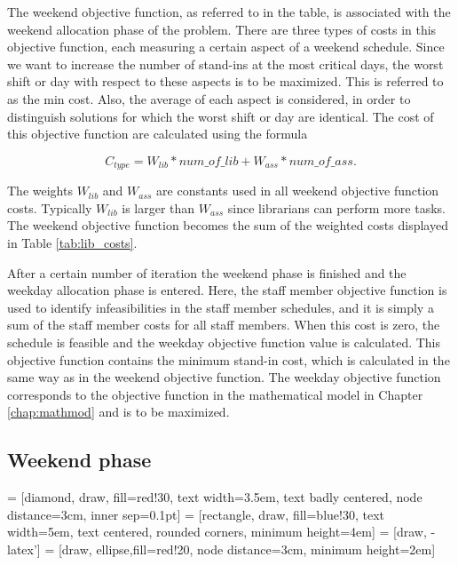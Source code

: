 The weekend objective function, as referred to in the table, is associated with the weekend allocation phase of the problem. There are three types of costs in this objective function, each measuring a certain aspect of a weekend schedule. Since we want to increase the number of stand-ins at the most critical days, the worst shift or day with respect to these aspects is to be maximized. This is referred to as the min cost. Also, the average of each aspect is considered, in order to distinguish solutions for which the worst shift or day are identical. The cost of this objective function are calculated using the formula

\begin{equation}
\label{eq:wend_cost_calc}
C_{type} = W_{lib}*num\_of\_lib + W_{ass}*num\_of\_ass.
\end{equation}

The weights $W_{lib}$ and $W_{ass}$ are constants used in all weekend objective function costs. Typically $W_{lib}$ is larger than $W_{ass}$ since librarians can perform more tasks. The weekend objective function becomes the sum of the weighted costs displayed in Table \ref{tab:lib_costs}. 

After a certain number of iteration the weekend phase is finished and the weekday allocation phase is entered. Here, the staff member objective function is used to identify infeasibilities in the staff member schedules, and it is simply a sum of the staff member costs for all staff members. When this cost is zero, the schedule is feasible and the weekday objective function value is calculated. This objective function contains the minimum stand-in cost, which is calculated in the same way as in the weekend objective function. The weekday objective function corresponds to the objective function in the mathematical model in Chapter \ref{chap:mathmod} and is to be maximized.

\subsection{Weekend phase}

 = [diamond, draw, fill=red!30,
    text width=3.5em, text badly centered, node distance=3cm, inner sep=0.1pt]
 = [rectangle, draw, fill=blue!30,
    text width=5em, text centered, rounded corners, minimum height=4em]
 = [draw, -latex']
 = [draw, ellipse,fill=red!20, node distance=3cm,
    minimum height=2em]

